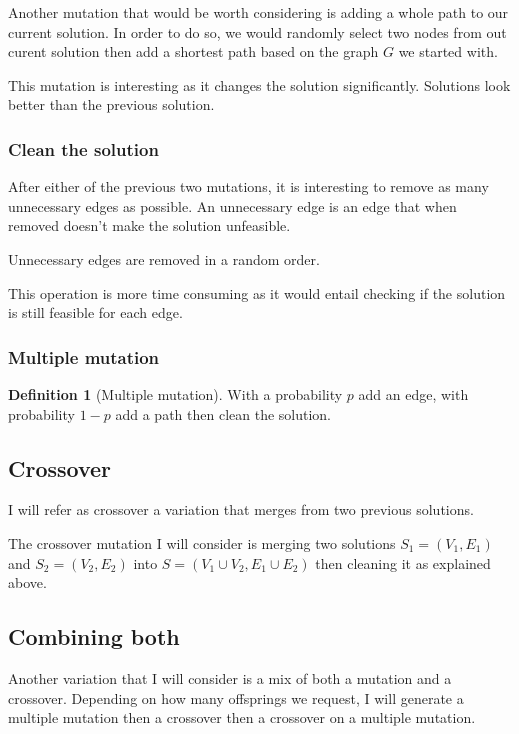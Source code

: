 \documentclass{article}
\theoremstyle{plain} %
\theoremstyle{definition} %
\newtheorem{definition}[theorem]{Definition}
\begin{document}
Another mutation that would be worth considering is adding a whole path to
our current solution. In order to do so, we would randomly select two nodes
from out curent solution then add a shortest path based on the graph $G$ we
started with.

This mutation is interesting as it changes the solution significantly.
Solutions look better than the previous solution.

\subsubsection{Clean the solution}

After either of the previous two mutations, it is interesting to remove as many
unnecessary edges as possible. An unnecessary edge is an edge that when removed
doesn't make the solution unfeasible.

Unnecessary edges are removed in a random order.

This operation is more time consuming as it would entail checking if the
solution is still feasible for each edge.

\subsubsection{Multiple mutation}

\begin{definition}[Multiple mutation]
With a probability $p$ add an edge, with probability $1-p$ add a path then
clean the solution.
\end{definition}

\subsection{Crossover}

I will refer as crossover a variation that merges from two previous solutions.

The crossover mutation I will consider is merging two solutions $S_1 = (V_1,
E_1)$ and $S_2 = (V_2, E_2)$ into $S = (V_1 \cup V_2,E_1 \cup E_2)$ then
cleaning it as explained above.

\subsection{Combining both}

Another variation that I will consider is a mix of both a mutation and a
crossover. Depending on how many offsprings we request, I will generate a
multiple mutation then a crossover then a crossover on a multiple mutation.
\end{document}
